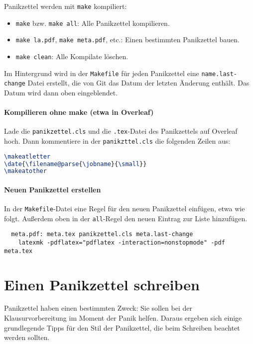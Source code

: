 \documentclass{panikzettel}
\begin{document}
Panikzettel werden mit \texttt{make} kompiliert:
\begin{itemize}
  \item \texttt{make} bzw. \texttt{make all}: Alle Panikzettel kompilieren.
  \item \texttt{make la.pdf}, \texttt{make meta.pdf}, etc.: Einen bestimmten Panikzettel bauen.
  \item \texttt{make clean}: Alle Kompilate löschen.
\end{itemize}

{\small{}
  Im Hintergrund wird in der \texttt{Makefile} für jeden Panikzettel eine \texttt{name.last-change} Datei erstellt, die von Git das Datum der letzten Änderung enthält.
  Das Datum wird dann oben eingeblendet.
}

\paragraph{Kompilieren ohne make (etwa in Overleaf)}

Lade die \texttt{panikzettel.cls} und die \texttt{.tex}-Datei des Panikzettels auf Overleaf hoch.
Dann kommentiere in der \texttt{panikzttel.cls} die folgenden Zeilen aus:
\begin{lstlisting}[language=tex]
% Show most recent revision number and date in date field
\makeatletter
\date{\filename@parse{\jobname}{\small}}
\makeatother
\end{lstlisting}

\paragraph{Neuen Panikzettel erstellen}

In der \texttt{Makefile}-Datei eine Regel für den neuen Panikzettel einfügen, etwa wie folgt.
Außerdem oben in der \texttt{all}-Regel den neuen Eintrag zur Liste hinzufügen.
\begin{lstlisting}
  meta.pdf: meta.tex panikzettel.cls meta.last-change
	latexmk -pdflatex="pdflatex -interaction=nonstopmode" -pdf meta.tex
\end{lstlisting}

\section{Einen Panikzettel schreiben}

Panikzettel haben einen bestimmten Zweck: Sie sollen bei der Klausurvorbereitung im Moment der Panik helfen.
Daraus ergeben sich einige grundlegende Tipps für den Stil der Panikzettel, die beim Schreiben beachtet werden sollten.
\end{document}
